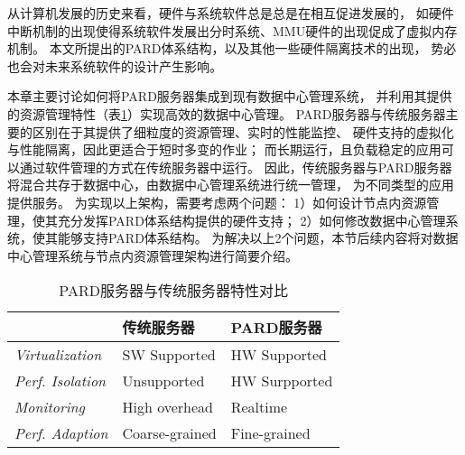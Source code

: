
从计算机发展的历史来看，硬件与系统软件总是总是在相互促进发展的，
如硬件中断机制的出现使得系统软件发展出分时系统、MMU硬件的出现促成了虚拟内存机制。
本文所提出的PARD体系结构，以及其他一些硬件隔离技术的出现\cite{intel-rdt}，
势必也会对未来系统软件的设计产生影响。

本章主要讨论如何将PARD服务器集成到现有数据中心管理系统，
并利用其提供的资源管理特性（表\ref{tab:pard-features}）实现高效的数据中心管理。
PARD服务器与传统服务器主要的区别在于其提供了细粒度的资源管理、实时的性能监控、
硬件支持的虚拟化与性能隔离，因此更适合于短时多变的作业；
而长期运行，且负载稳定的应用可以通过软件管理的方式在传统服务器中运行。
因此，传统服务器与PARD服务器将混合共存于数据中心，由数据中心管理系统进行统一管理，
为不同类型的应用提供服务。
为实现以上架构，需要考虑两个问题：
1）如何设计节点内资源管理，使其充分发挥PARD体系结构提供的硬件支持；
2）如何修改数据中心管理系统，使其能够支持PARD体系结构。
为解决以上2个问题，本节后续内容将对数据中心管理系统与节点内资源管理架构进行简要介绍。

\begin{table}[hb]
  \centering
  \begin{minipage}[t]{0.7\linewidth}
  \caption{PARD服务器与传统服务器特性对比}
  \label{tab:pard-features}
  \begin{tabular}{p{}p{}p{}}
    \toprule[1.5pt]
                             & \textbf{传统服务器} & \textbf{PARD服务器} \\
    \midrule[1pt]
      \emph{Virtualization}  & SW Supported        & HW Supported        \\
      \emph{Perf. Isolation} & Unsupported         & HW Surpported       \\
      \emph{Monitoring}      & High overhead       & Realtime            \\
      \emph{Perf. Adaption}  & Coarse-grained      & Fine-grained        \\
    \bottomrule[1.5pt]
  \end{tabular}
  \end{minipage}
\end{table}



